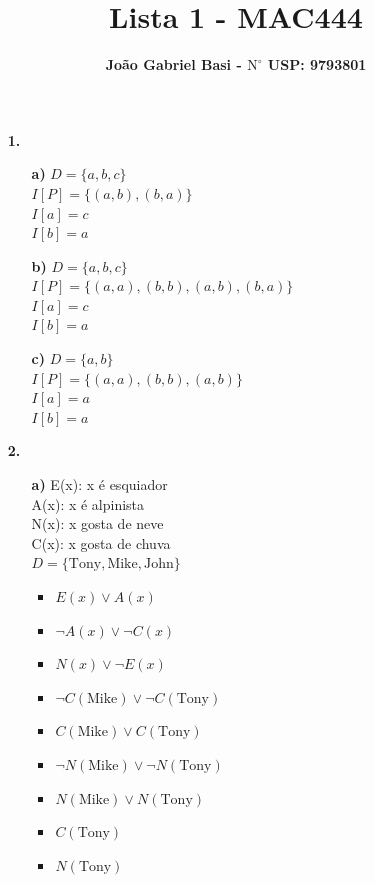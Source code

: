 \documentclass[12pt, a4paper]{article} %
\title{\textbf{Lista 1 - MAC444}}
\date{}
\author{\textbf{João Gabriel Basi - $\text{N}^\circ$ USP: 9793801}}
\begin{document}
\maketitle
\begin{enumerate}
\item[\textbf{1.}]
\begin{enumerate}
\item[\textbf{a)}]
$D = \{a, b, c\}$\\
$I[P] = \{(a, b), (b, a)\}$\\
$I[a] = c$\\
$I[b] = a$\\

\item[\textbf{b)}]
$D = \{a, b, c\}$\\
$I[P] = \{(a, a), (b, b), (a, b), (b, a)\}$\\
$I[a] = c$\\
$I[b] = a$\\

\item[\textbf{c)}]
$D = \{a, b\}$\\
$I[P] = \{(a, a), (b, b), (a, b)\}$\\
$I[a] = a$\\
$I[b] = a$\\
\end{enumerate}

\item[\textbf{2.}]
\begin{enumerate}
\item[\textbf{a)}]
E(x): x é esquiador\\
A(x): x é alpinista\\
N(x): x gosta de neve\\
C(x): x gosta de chuva\\[0.4cm]
$D = \{\text{Tony}, \text{Mike}, \text{John}\}$
\begin{itemize}
\item $E(x) \lor A(x)$
\item $\lnot A(x) \lor \lnot C(x)$
\item $N(x) \lor \lnot E(x)$
\item $\lnot C(\text{Mike}) \lor \lnot C(\text{Tony})$
\item $C(\text{Mike}) \lor C(\text{Tony})$
\item $\lnot N(\text{Mike}) \lor \lnot N(\text{Tony})$
\item $N(\text{Mike}) \lor N(\text{Tony})$
\item $C(\text{Tony})$
\item $N(\text{Tony})$\\[2cm]
\end{itemize}


\end{enumerate}
\end{enumerate}
\end{document}
